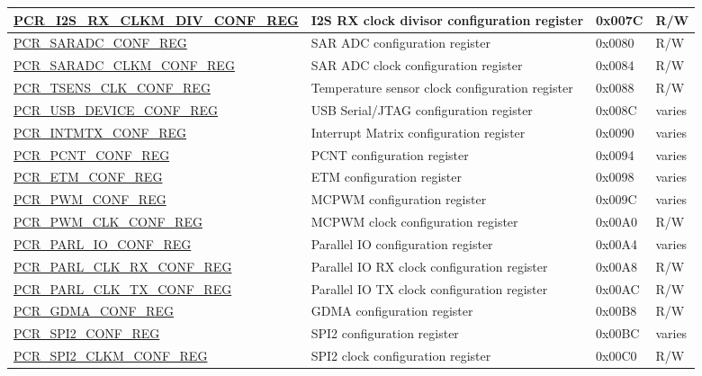 \begin{longtable}{ | p{7.2cm} | p{6cm} | p{1.3cm} | p{1cm} | }
\hyperref[regdesc:PCRI2SRXCLKMDIVCONFREG]{PCR\_I2S\_RX\_CLKM\_DIV\_CONF\_REG} & I2S RX clock divisor configuration register & 0x007C & R/W \\ \hline
\hyperref[regdesc:PCRSARADCCONFREG]{PCR\_SARADC\_CONF\_REG} & SAR ADC configuration register & 0x0080 & R/W \\ \hline
\hyperref[regdesc:PCRSARADCCLKMCONFREG]{PCR\_SARADC\_CLKM\_CONF\_REG} & SAR ADC clock configuration register & 0x0084 & R/W \\ \hline
\hyperref[regdesc:PCRTSENSCLKCONFREG]{PCR\_TSENS\_CLK\_CONF\_REG} & Temperature sensor clock configuration register & 0x0088 & R/W \\ \hline
\hyperref[regdesc:PCRUSBDEVICECONFREG]{PCR\_USB\_DEVICE\_CONF\_REG} & USB Serial/JTAG configuration register & 0x008C & varies \\ \hline
\hyperref[regdesc:PCRINTMTXCONFREG]{PCR\_INTMTX\_CONF\_REG} & Interrupt Matrix configuration register & 0x0090 & varies \\ \hline
\hyperref[regdesc:PCRPCNTCONFREG]{PCR\_PCNT\_CONF\_REG} & PCNT configuration register & 0x0094 & varies \\ \hline
\hyperref[regdesc:PCRETMCONFREG]{PCR\_ETM\_CONF\_REG} & ETM configuration register & 0x0098 & varies \\ \hline
\hyperref[regdesc:PCRPWMCONFREG]{PCR\_PWM\_CONF\_REG} & MCPWM configuration register & 0x009C & varies \\ \hline
\hyperref[regdesc:PCRPWMCLKCONFREG]{PCR\_PWM\_CLK\_CONF\_REG} & MCPWM clock configuration register & 0x00A0 & R/W \\ \hline
\hyperref[regdesc:PCRPARLIOCONFREG]{PCR\_PARL\_IO\_CONF\_REG} & Parallel IO configuration register & 0x00A4 & varies \\ \hline
\hyperref[regdesc:PCRPARLCLKRXCONFREG]{PCR\_PARL\_CLK\_RX\_CONF\_REG} & Parallel IO RX clock configuration register & 0x00A8 & R/W \\ \hline
\hyperref[regdesc:PCRPARLCLKTXCONFREG]{PCR\_PARL\_CLK\_TX\_CONF\_REG} & Parallel IO TX clock configuration register & 0x00AC & R/W \\ \hline
\hyperref[regdesc:PCRGDMACONFREG]{PCR\_GDMA\_CONF\_REG} & GDMA configuration register & 0x00B8 & R/W \\ \hline
\hyperref[regdesc:PCRSPI2CONFREG]{PCR\_SPI2\_CONF\_REG} & SPI2 configuration register & 0x00BC & varies \\ \hline
\hyperref[regdesc:PCRSPI2CLKMCONFREG]{PCR\_SPI2\_CLKM\_CONF\_REG} & SPI2 clock configuration register & 0x00C0 & R/W \\ \hline

\end{longtable}
